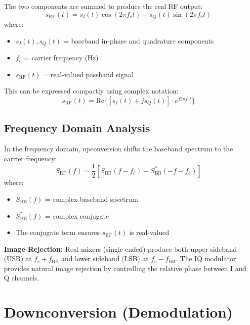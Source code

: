The two components are summed to produce the real RF output:
\begin{equation}
s_{\text{RF}}(t) = s_I(t)\cos(2\pi f_c t) - s_Q(t)\sin(2\pi f_c t)
\end{equation}
where:
\begin{itemize}
\item $s_I(t), s_Q(t)$ = baseband in-phase and quadrature components
\item $f_c$ = carrier frequency (Hz)
\item $s_{\text{RF}}(t)$ = real-valued passband signal
\end{itemize}

This can be expressed compactly using complex notation:
\begin{equation}
s_{\text{RF}}(t) = \text{Re}\{[s_I(t) + js_Q(t)] \cdot e^{j2\pi f_c t}\}
\end{equation}

\subsection{Frequency Domain Analysis}

In the frequency domain, upconversion shifts the baseband spectrum to the carrier frequency:
\begin{equation}
S_{\text{RF}}(f) = \frac{1}{2}[S_{\text{BB}}(f - f_c) + S_{\text{BB}}^*(-f - f_c)]
\end{equation}
where:
\begin{itemize}
\item $S_{\text{BB}}(f)$ = complex baseband spectrum
\item $S_{\text{BB}}^*(f)$ = complex conjugate
\item The conjugate term ensures $s_{\text{RF}}(t)$ is real-valued
\end{itemize}

\begin{warningbox}
\textbf{Image Rejection:} Real mixers (single-ended) produce both upper sideband (USB) at $f_c + f_{\text{BB}}$ and lower sideband (LSB) at $f_c - f_{\text{BB}}$. The IQ modulator provides natural image rejection by controlling the relative phase between I and Q channels.
\end{warningbox}

\section{Downconversion (Demodulation)}

